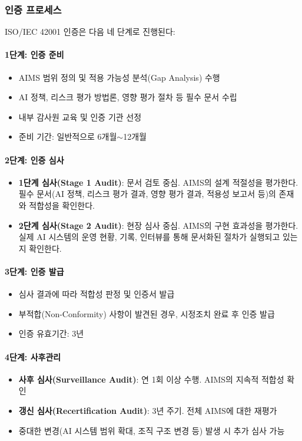 \subsubsection{인증 프로세스}

ISO/IEC 42001 인증은 다음 네 단계로 진행된다:

\paragraph{1단계: 인증 준비}
\begin{itemize}
 \item AIMS 범위 정의 및 적용 가능성 분석(Gap Analysis) 수행
 \item AI 정책, 리스크 평가 방법론, 영향 평가 절차 등 필수 문서 수립
 \item 내부 감사원 교육 및 인증 기관 선정
 \item 준비 기간: 일반적으로 6개월$\sim$12개월
\end{itemize}

\paragraph{2단계: 인증 심사}
\begin{itemize}
 \item \textbf{1단계 심사(Stage 1 Audit)}: 문서 검토 중심. AIMS의 설계 적절성을 평가한다. 필수 문서(AI 정책, 리스크 평가 결과, 영향 평가 결과, 적용성 보고서 등)의 존재와 적합성을 확인한다.
 \item \textbf{2단계 심사(Stage 2 Audit)}: 현장 심사 중심. AIMS의 구현 효과성을 평가한다. 실제 AI 시스템의 운영 현황, 기록, 인터뷰를 통해 문서화된 절차가 실행되고 있는지 확인한다.
\end{itemize}

\paragraph{3단계: 인증 발급}
\begin{itemize}
 \item 심사 결과에 따라 적합성 판정 및 인증서 발급
 \item 부적합(Non-Conformity) 사항이 발견된 경우, 시정조치 완료 후 인증 발급
 \item 인증 유효기간: 3년
\end{itemize}

\paragraph{4단계: 사후관리}
\begin{itemize}
 \item \textbf{사후 심사(Surveillance Audit)}: 연 1회 이상 수행. AIMS의 지속적 적합성 확인
 \item \textbf{갱신 심사(Recertification Audit)}: 3년 주기. 전체 AIMS에 대한 재평가
 \item 중대한 변경(AI 시스템 범위 확대, 조직 구조 변경 등) 발생 시 추가 심사 가능
\end{itemize}


